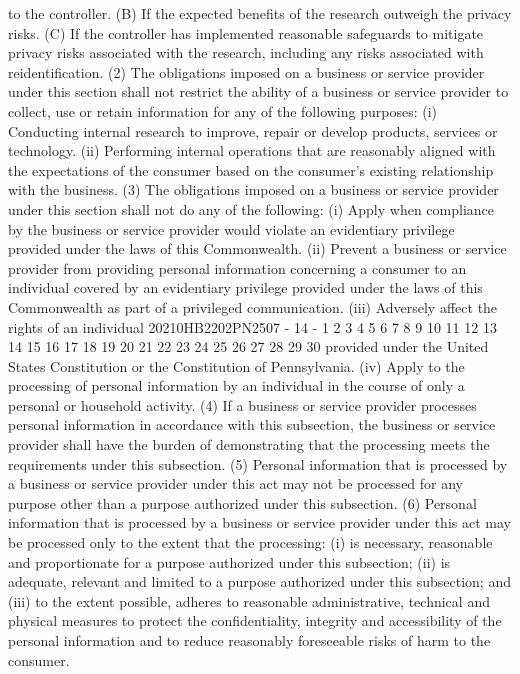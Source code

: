 to the controller.
(B) If the expected benefits of the research
outweigh the privacy risks.
(C) If the controller has implemented reasonable
safeguards to mitigate privacy risks associated with
the research, including any risks associated with
reidentification.
(2) The obligations imposed on a business or service
provider under this section shall not restrict the ability of
a business or service provider to collect, use or retain
information for any of the following purposes:
(i) Conducting internal research to improve, repair
or develop products, services or technology.
(ii) Performing internal operations that are
reasonably aligned with the expectations of the consumer
based on the consumer's existing relationship with the
business.
(3) The obligations imposed on a business or service
provider under this section shall not do any of the
following:
(i) Apply when compliance by the business or service
provider would violate an evidentiary privilege provided
under the laws of this Commonwealth.
(ii) Prevent a business or service provider from
providing personal information concerning a consumer to
an individual covered by an evidentiary privilege
provided under the laws of this Commonwealth as part of a
privileged communication.
(iii) Adversely affect the rights of an individual
20210HB2202PN2507 - 14 -
1
2
3
4
5
6
7
8
9
10
11
12
13
14
15
16
17
18
19
20
21
22
23
24
25
26
27
28
29
30
provided under the United States Constitution or the
Constitution of Pennsylvania.
(iv) Apply to the processing of personal information
by an individual in the course of only a personal or
household activity.
(4) If a business or service provider processes personal
information in accordance with this subsection, the business
or service provider shall have the burden of demonstrating
that the processing meets the requirements under this
subsection.
(5) Personal information that is processed by a business
or service provider under this act may not be processed for
any purpose other than a purpose authorized under this
subsection.
(6) Personal information that is processed by a business
or service provider under this act may be processed only to
the extent that the processing:
(i) is necessary, reasonable and proportionate for a
purpose authorized under this subsection;
(ii) is adequate, relevant and limited to a purpose
authorized under this subsection; and
(iii) to the extent possible, adheres to reasonable
administrative, technical and physical measures to
protect the confidentiality, integrity and accessibility
of the personal information and to reduce reasonably
foreseeable risks of harm to the consumer.
